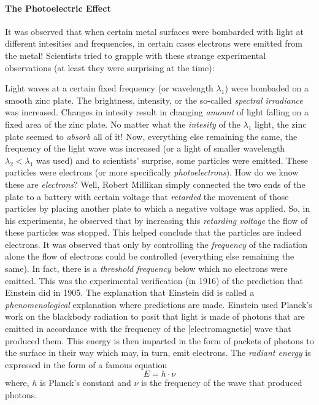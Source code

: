 \documentclass{article}
\begin{document}
{\paragraph{The Photoelectric Effect}

It was observed that when certain metal surfaces were bombarded with light at different intesities and frequencies, in certain cases electrons were emitted from the metal! Scientists tried to grapple with these strange experimental observations (at least they were surprising at the time):

Light waves at a certain fixed frequency (or wavelength $\lambda_1$) were bombaded on a smooth zinc plate. The brightness, intensity, or the so-called \emph{spectral irradiance} was increased. Changes in intesity result in changing \emph{amount} of light falling on a fixed area of the zinc plate. No matter what the \emph{intesity} of the $\lambda_1$ light, the zinc plate seemed to \emph{absorb} all of it! Now, everything else remaining the same, the frequency of the light wave was increased (or a light of smaller wavelength $\lambda_2 < \lambda_1$ was used) and to scientists' surprise, some particles were emitted. These particles were electrons (or more specifically \emph{photoelectrons}). How do we know these are \emph{electrons}? Well, Robert Millikan simply connected the two ends of the plate to a battery with certain voltage that \emph{retarded} the movement of those particles by placing another plate to which a negative voltage was applied. So, in his experiments, he observed that by increasing this \emph{retarding voltage} the flow of these particles was stopped. This helped conclude that the particles are indeed electrons. It was observed that only by controlling the \emph{frequency} of the radiation alone the flow of electrons could be controlled (everything else remaining the same). In fact, there is a \emph{threshold frequency} below which no electrons were emitted. This was the experimental verification (in 1916) of the prediction that Einstein did in 1905. The explanation that Einstein did is called a \emph{phenomenological} explanation where predictions are made. Einstein used Planck's work on the blackbody radiation to posit that light is made of photons that are emitted in accordance with the frequency of the [electromagnetic] wave that produced them. This energy is then imparted in the form of packets of photons to the surface in their way which may, in turn, emit electrons. The \emph{radiant energy} is expressed in the form of a famous equation
\begin{equation}
    \label{eqn: planck's equation}
    E = h\cdot \nu
\end{equation}
where, $h$ is Planck's constant and $\nu$ is the frequency of the wave that produced photons.

}
\end{document}
